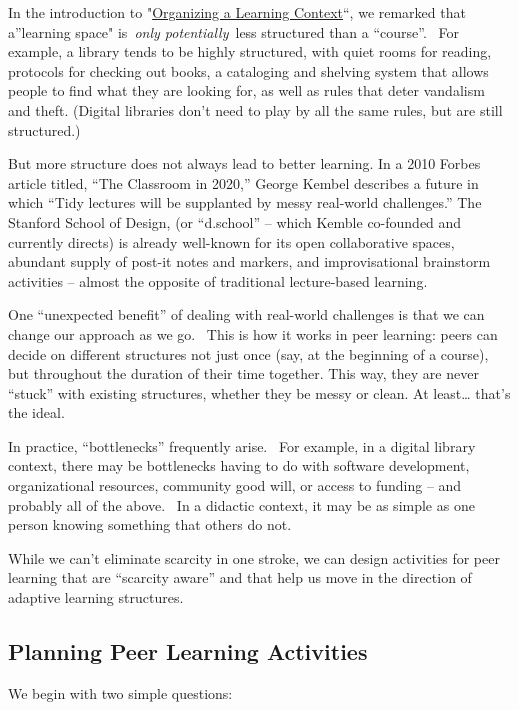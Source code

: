 In the introduction to
"\href{http://socialmediaclassroom.com/host/peeragogy/wiki/organizing-a-learning-context}{Organizing
a Learning Context}``, we remarked that a''learning space" is~\emph{only
potentially}~less structured than a ``course''. ~For example, a library
tends to be highly structured, with quiet rooms for reading, protocols
for checking out books, a cataloging and shelving system that allows
people to find what they are looking for, as well as rules that deter
vandalism and theft. (Digital libraries don't need to play by all the
same rules, but are still structured.)

But more structure does not always lead to better learning. In a 2010
Forbes article titled, ``The Classroom in 2020,'' George Kembel
describes a future in which ``Tidy lectures will be supplanted by messy
real-world challenges.'' The Stanford School of Design, (or ``d.school''
-- which Kemble co-founded and currently directs) is already well-known
for its open collaborative spaces, abundant supply of post-it notes and
markers, and improvisational brainstorm activities -- almost the
opposite of traditional lecture-based learning.

One ``unexpected benefit'' of dealing with real-world challenges is that
we can change our approach as we go. ~This is how it works in peer
learning: peers can decide on different structures not just once (say,
at the beginning of a course), but throughout the duration of their time
together. This way, they are never ``stuck'' with existing structures,
whether they be messy or clean. At least\ldots{} that's the ideal.

In practice, ``bottlenecks'' frequently arise. ~For example, in a
digital library context, there may be bottlenecks having to do with
software development, organizational resources, community good will, or
access to funding -- and probably all of the above. ~In a didactic
context, it may be as simple as one person knowing something that others
do not.

While we can't eliminate scarcity in one stroke, we can design
activities for peer learning that are ``scarcity aware'' and that help
us move in the direction of adaptive learning structures.

\subsection{Planning Peer Learning Activities}

We begin with two simple questions:

